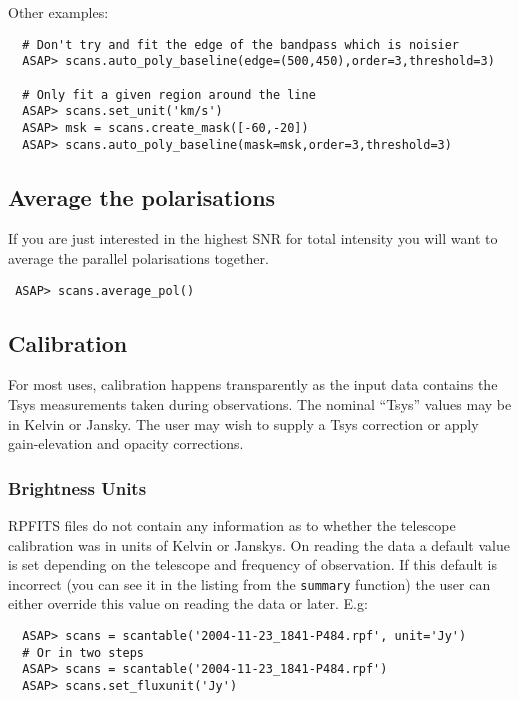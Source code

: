 \documentclass[11pt]{article}
\newcommand{\cmd}[1]{{\tt #1}}
\begin{document}
Other examples:

\begin{verbatim}
  # Don't try and fit the edge of the bandpass which is noisier
  ASAP> scans.auto_poly_baseline(edge=(500,450),order=3,threshold=3)

  # Only fit a given region around the line
  ASAP> scans.set_unit('km/s')
  ASAP> msk = scans.create_mask([-60,-20])
  ASAP> scans.auto_poly_baseline(mask=msk,order=3,threshold=3)

\end{verbatim}

\subsection{Average the polarisations}

If you are just interested in the highest SNR for total intensity you
will want to average the parallel polarisations together.

\begin{verbatim}
 ASAP> scans.average_pol()
\end{verbatim}

\subsection{Calibration}

For most uses, calibration happens transparently as the input data
contains the Tsys measurements taken during observations. The nominal
``Tsys'' values may be in Kelvin or Jansky. The user may wish to
supply a Tsys correction or apply gain-elevation and opacity
corrections.

\subsubsection{Brightness Units}

RPFITS files do not contain any information as
to whether the telescope calibration was in units of Kelvin or
Janskys.  On reading the data a default value is set depending on the
telescope and frequency of observation.  If this default is incorrect
(you can see it in the listing from the \cmd{summary} function) the
user can either override this value on reading the data or later.
E.g:

\begin{verbatim}
  ASAP> scans = scantable('2004-11-23_1841-P484.rpf', unit='Jy')
  # Or in two steps
  ASAP> scans = scantable('2004-11-23_1841-P484.rpf')
  ASAP> scans.set_fluxunit('Jy')
\end{verbatim}
\end{document}
